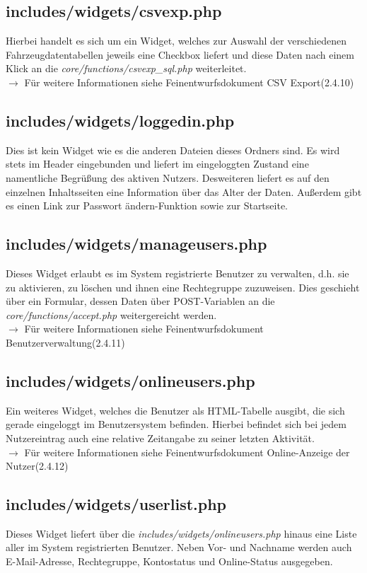 \documentclass[fontsize = 12pt, paper = a4]{scrreprt}
\begin{document}
\subsection{includes/widgets/csvexp.php}
Hierbei handelt es sich um ein Widget, welches zur Auswahl der verschiedenen Fahrzeugdatentabellen jeweils eine Checkbox liefert und diese Daten nach einem Klick an die \textit{core/functions/csvexp\_sql.php} weiterleitet.\\
$\rightarrow$ Für weitere Informationen siehe Feinentwurfsdokument \glqq CSV Export\grqq (2.4.10)

\subsection{includes/widgets/loggedin.php}
Dies ist kein Widget wie es die anderen Dateien dieses Ordners sind. Es wird stets im Header eingebunden und liefert im eingeloggten Zustand eine namentliche Begrüßung des aktiven Nutzers. Desweiteren liefert es auf den einzelnen Inhaltsseiten eine Information über das Alter der Daten. Außerdem gibt es einen Link zur \glqq Passwort ändern\grqq-Funktion sowie zur Startseite.

\subsection{includes/widgets/manageusers.php}
Dieses Widget erlaubt es im System registrierte Benutzer zu verwalten, d.h. sie zu aktivieren, zu löschen und ihnen eine Rechtegruppe zuzuweisen. Dies geschieht über ein Formular, dessen Daten über POST-Variablen an die \textit{core/functions/accept.php} weitergereicht werden.\\
$\rightarrow$ Für weitere Informationen siehe Feinentwurfsdokument \glqq Benutzerverwaltung\grqq (2.4.11)

\subsection{includes/widgets/onlineusers.php}
Ein weiteres Widget, welches die Benutzer als HTML-Tabelle ausgibt, die sich gerade eingeloggt im Benutzersystem befinden. Hierbei befindet sich bei jedem Nutzereintrag auch eine relative Zeitangabe zu seiner letzten Aktivität.\\
$\rightarrow$ Für weitere Informationen siehe Feinentwurfsdokument \glqq Online-Anzeige der Nutzer\grqq (2.4.12)

\subsection{includes/widgets/userlist.php}
Dieses Widget liefert über die \textit{includes/widgets/onlineusers.php} hinaus eine Liste aller im System registrierten Benutzer. Neben Vor- und Nachname werden auch E-Mail-Adresse, Rechtegruppe, Kontostatus und Online-Status ausgegeben.
\end{document}
